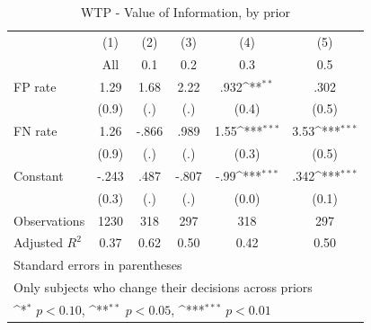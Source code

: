 \begin{table}[htbp]\centering
\def\sym#1{\ifmmode^{#1}\else\(^{#1}\)\fi}
\caption{WTP - Value of Information, by prior}
\begin{tabular}{l*{5}{c}}
\hline\hline
                &\multicolumn{1}{c}{(1)}&\multicolumn{1}{c}{(2)}&\multicolumn{1}{c}{(3)}&\multicolumn{1}{c}{(4)}&\multicolumn{1}{c}{(5)}\\
                &\multicolumn{1}{c}{All}&\multicolumn{1}{c}{0.1}&\multicolumn{1}{c}{0.2}&\multicolumn{1}{c}{0.3}&\multicolumn{1}{c}{0.5}\\
\hline
FP rate         &     1.29         &     1.68         &     2.22         &     .932\sym{**} &     .302         \\
                &    (0.9)         &      (.)         &      (.)         &    (0.4)         &    (0.5)         \\
FN rate         &     1.26         &    -.866         &     .989         &     1.55\sym{***}&     3.53\sym{***}\\
                &    (0.9)         &      (.)         &      (.)         &    (0.3)         &    (0.5)         \\
Constant        &    -.243         &     .487         &    -.807         &     -.99\sym{***}&     .342\sym{***}\\
                &    (0.3)         &      (.)         &      (.)         &    (0.0)         &    (0.1)         \\
\hline
Observations    &     1230         &      318         &      297         &      318         &      297         \\
Adjusted \(R^{2}\)&     0.37         &     0.62         &     0.50         &     0.42         &     0.50         \\
\hline\hline
\multicolumn{6}{l}{\footnotesize Standard errors in parentheses}\\
\multicolumn{6}{l}{\footnotesize Only subjects who change their decisions across priors}\\
\multicolumn{6}{l}{\footnotesize \sym{*} \(p<0.10\), \sym{**} \(p<0.05\), \sym{***} \(p<0.01\)}\\
\end{tabular}
\end{table}
